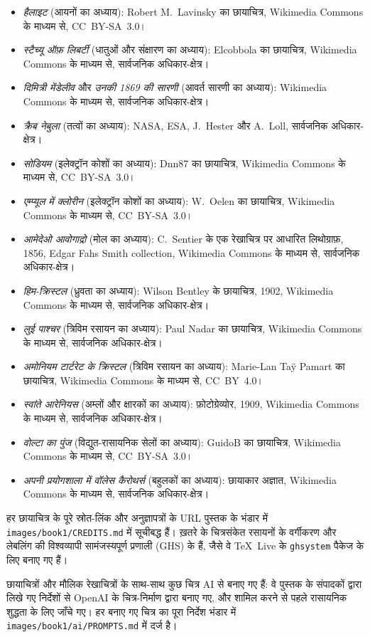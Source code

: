 \begin{itemize}
  \item \emph{हैलाइट} (आयनों का अध्याय): Robert M.~Lavinsky का छायाचित्र,
        Wikimedia Commons के माध्यम से, CC~BY-SA~3.0।
  \item \emph{स्टैच्यू ऑफ़ लिबर्टी} (धातुओं और संक्षारण का अध्याय): Elcobbola का
        छायाचित्र, Wikimedia Commons के माध्यम से, सार्वजनिक अधिकार-क्षेत्र।
  \item \emph{दिमित्री मेंडेलीव} और \emph{उनकी 1869 की सारणी} (आवर्त सारणी का
        अध्याय): Wikimedia Commons के माध्यम से, सार्वजनिक अधिकार-क्षेत्र।
  \item \emph{क्रैब नेबुला} (तत्वों का अध्याय): NASA, ESA, J.~Hester और
        A.~Loll, सार्वजनिक अधिकार-क्षेत्र।
  \item \emph{सोडियम} (इलेक्ट्रॉन कोशों का अध्याय): Dnn87 का छायाचित्र,
        Wikimedia Commons के माध्यम से, CC~BY-SA~3.0।
  \item \emph{एम्प्यूल में क्लोरीन} (इलेक्ट्रॉन कोशों का अध्याय): W.~Oelen का
        छायाचित्र, Wikimedia Commons के माध्यम से, CC~BY-SA~3.0।
  \item \emph{आमेदेओ आवोगाद्रो} (मोल का अध्याय): C.~Sentier के एक रेखाचित्र पर
        आधारित लिथोग्राफ़, 1856, Edgar Fahs Smith collection, Wikimedia
        Commons के माध्यम से, सार्वजनिक अधिकार-क्षेत्र।
  \item \emph{हिम-क्रिस्टल} (ध्रुवता का अध्याय): Wilson Bentley के छायाचित्र,
        1902, Wikimedia Commons के माध्यम से, सार्वजनिक अधिकार-क्षेत्र।
  \item \emph{लुई पाश्चर} (त्रिविम रसायन का अध्याय): Paul Nadar का छायाचित्र,
        Wikimedia Commons के माध्यम से, सार्वजनिक अधिकार-क्षेत्र।
  \item \emph{अमोनियम टार्टरेट के क्रिस्टल} (त्रिविम रसायन का अध्याय):
        Marie-Lan Taÿ Pamart का छायाचित्र, Wikimedia Commons के माध्यम से,
        CC~BY~4.0।
  \item \emph{स्वांते आरेनियस} (अम्लों और क्षारकों का अध्याय): फ़ोटोग्रेव्योर,
        1909, Wikimedia Commons के माध्यम से, सार्वजनिक अधिकार-क्षेत्र।
  \item \emph{वोल्टा का पुंज} (विद्युत-रासायनिक सेलों का अध्याय): GuidoB का छायाचित्र,
        Wikimedia Commons के माध्यम से, CC~BY-SA~3.0।
  \item \emph{अपनी प्रयोगशाला में वॉलेस कैरोथर्स} (बहुलकों का अध्याय):
        छायाकार अज्ञात, Wikimedia Commons के माध्यम से, सार्वजनिक
        अधिकार-क्षेत्र।
\end{itemize}

हर छायाचित्र के पूरे स्रोत-लिंक और अनुज्ञापत्रों के URL पुस्तक के भंडार में
\texttt{images/book1/CREDITS.md} में सूचीबद्ध हैं। ख़तरे के चित्रसंकेत रसायनों के
वर्गीकरण और लेबलिंग की विश्वव्यापी सामंजस्यपूर्ण प्रणाली (GHS) के हैं, जैसे वे
\TeX\ Live के \texttt{ghsystem} पैकेज के लिए बनाए गए हैं।

\bigskip
छायाचित्रों और मौलिक रेखाचित्रों के साथ-साथ कुछ चित्र AI से बनाए गए हैं: वे
पुस्तक के संपादकों द्वारा लिखे गए निर्देशों से OpenAI के चित्र-निर्माण द्वारा बनाए
गए, और शामिल करने से पहले रासायनिक शुद्धता के लिए जाँचे गए। हर बनाए गए चित्र का
पूरा निर्देश भंडार में \texttt{images/book1/ai/PROMPTS.md} में दर्ज है।
\clearpage
